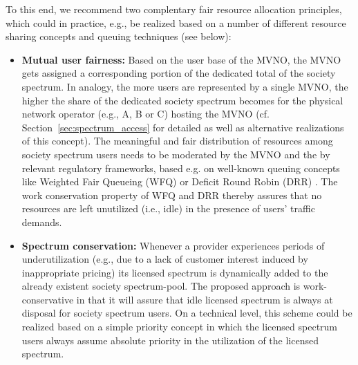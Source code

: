 \documentclass[conference]{IEEEtran}
\newcommand\secref{Section~\ref}
\begin{document}
To this end, we recommend two complentary fair resource allocation principles, which could in practice, e.g., be realized based on a number of different resource sharing concepts and queuing techniques (see below):





\begin{itemize}
\item \textbf{Mutual user fairness:} Based on the user base of the MVNO, the MVNO gets assigned a corresponding portion of the dedicated total of the society spectrum. In analogy, the more users are represented by a single MVNO, the higher the share of the dedicated society spectrum becomes for the physical network operator (e.g., A, B or C) hosting the MVNO (cf. \secref{sec:spectrum_access} for detailed as well as alternative realizations of this concept). The meaningful and fair distribution of resources among society spectrum users needs to be moderated by the MVNO and the by relevant regulatory frameworks, based e.g. on well-known queuing concepts like Weighted Fair Queueing (WFQ) \cite{wfq-acm, wfq-ieee} or Deficit Round Robin (DRR) \cite{drr-ton}. The work conservation property of WFQ and DRR thereby assures that no resources are left unutilized (i.e., idle) in the presence of users' traffic demands.
	\item \textbf{Spectrum conservation:}
	Whenever a provider experiences periods of underutilization (e.g., due to a lack of customer interest induced by inappropriate pricing) its licensed spectrum is dynamically added to the already existent society spectrum-pool. The proposed approach is work-conservative in that it will assure that idle licensed spectrum is always at disposal for society spectrum users. On a technical level, this scheme could be realized based on a simple priority concept in which the licensed spectrum users always assume absolute priority in the utilization of the licensed spectrum.  


\end{itemize}
\end{document}
